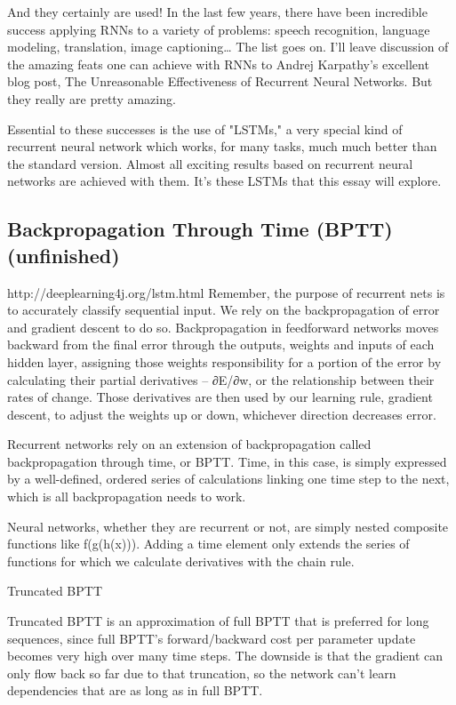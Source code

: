 {And they certainly are used! In the last few years, there have been incredible success applying RNNs to a variety of problems: speech recognition, language modeling, translation, image captioning… The list goes on. I’ll leave discussion of the amazing feats one can achieve with RNNs to Andrej Karpathy’s excellent blog post, The Unreasonable Effectiveness of Recurrent Neural Networks. But they really are pretty amazing.

Essential to these successes is the use of "LSTMs," a very special kind of recurrent neural network which works, for many tasks, much much better than the standard version. Almost all exciting results based on recurrent neural networks are achieved with them. It’s these LSTMs that this essay will explore.


\subsection{Backpropagation Through Time (BPTT) (unfinished)}
http://deeplearning4j.org/lstm.html
Remember, the purpose of recurrent nets is to accurately classify sequential input. We rely on the backpropagation of error and gradient descent to do so.
Backpropagation in feedforward networks moves backward from the final error through the outputs, weights and inputs of each hidden layer, assigning those weights responsibility for a portion of the error by calculating their partial derivatives – ∂E/∂w, or the relationship between their rates of change. Those derivatives are then used by our learning rule, gradient descent, to adjust the weights up or down, whichever direction decreases error.

Recurrent networks rely on an extension of backpropagation called backpropagation through time, or BPTT. Time, in this case, is simply expressed by a well-defined, ordered series of calculations linking one time step to the next, which is all backpropagation needs to work.

Neural networks, whether they are recurrent or not, are simply nested composite functions like f(g(h(x))). Adding a time element only extends the series of functions for which we calculate derivatives with the chain rule.

Truncated BPTT

Truncated BPTT is an approximation of full BPTT that is preferred for long sequences, since full BPTT’s forward/backward cost per parameter update becomes very high over many time steps. The downside is that the gradient can only flow back so far due to that truncation, so the network can’t learn dependencies that are as long as in full BPTT.

}
